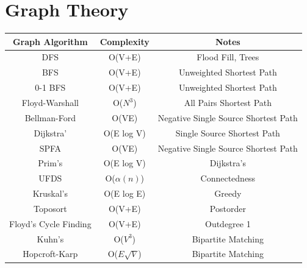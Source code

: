 \documentclass{article}
\begin{document}
\section{Graph Theory}
\begin{table}[H]
\begin{tabular}{|c|c|c|}
\hline
Graph Algorithm           & Complexity                                  & Notes                                \\ \hline
DFS                       & O(V+E)                                      & Flood Fill, Trees                    \\ \hline
BFS                       & O(V+E)                                      & Unweighted Shortest Path             \\ \hline
0-1 BFS                   & O(V+E)                                      & Unweighted Shortest Path             \\ \hline
Floyd-Warshall            & O($N^{3}$)                                  & All Pairs Shortest Path              \\ \hline
Bellman-Ford              & O(VE)                                       & Negative Single Source Shortest Path \\ \hline
Dijkstra'                 & O(E log V)                                  & Single Source Shortest Path          \\ \hline
SPFA                      & O(VE)                                       & Negative Single Source Shortest Path \\ \hline
Prim's                    & O(E log V)                                  & Dijkstra's                           \\ \hline
UFDS                      & O($\alpha(n)$)                              & Connectedness                        \\ \hline
Kruskal's                 & O(E log E)                                  & Greedy                               \\ \hline
Toposort                  & O(V+E)                                      & Postorder                            \\ \hline
Floyd's Cycle Finding     & O(V+E)                                      & Outdegree 1                          \\ \hline
Kuhn's                    & O($V^{3}$)                                  & Bipartite Matching                   \\ \hline
Hopcroft-Karp             & O($E\sqrt{V}$)                              & Bipartite Matching                   \\ \hline

\end{tabular}
\end{table}
\end{document}
